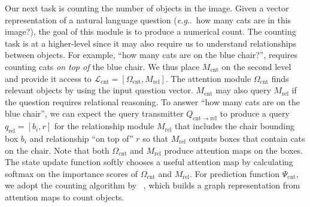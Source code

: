 \documentclass{article}
\makeatletter
\def\Mrel{M_\mathrm{rel}}
\def\Mcnt{M_\mathrm{cnt}}
\DeclareRobustCommand\onedot{\futurelet\@let@token\@onedot}
\def\@onedot{\ifx\@let@token.\else.\null\fi\xspace}
\def\eg{\emph{e.g}\onedot} \def\Eg{\emph{E.g}\onedot}
\makeatother
\begin{document}
Our next task is counting the number of objects in the image.
Given a vector representation of a natural language question (\eg~how many cats are in this image?), the goal of this module is to produce a numerical count.
The counting task is at a higher-level since it may also require us to understand relationships between objects.
For example, ``how many cats are on the blue chair?'', requires counting cats \emph{on top of} the blue chair.
We thus place $\Mcnt$ on the second level and provide it access to $\mathcal L_\mathrm{cnt} = [\Omega_\mathrm{cnt}, \Mrel]$.
The attention module $\Omega_\mathrm{cnt}$ finds relevant objects by using the input question vector.
$\Mcnt$ may also query $\Mrel$ if the question requires relational reasoning.
To answer ``how many cats are on the blue chair'', we can expect the query transmitter $Q_{\mathrm{cnt}\rightarrow \mathrm{rel}}$ to produce a query $q_\mathrm{rel} = [b_i, r]$ for the relationship module $\Mrel$ that includes the chair bounding box $b_i$ and relationship ``on top of'' $r$ so that $\Mrel$ outputs boxes that contain cats on the chair.
Note that both $\Omega_\mathrm{cnt}$ and $\Mrel$ produce attention maps on the boxes.
The state update function softly chooses a useful attention map by calculating softmax on the importance scores of $\Omega_\mathrm{cnt}$ and $\Mrel$.
For prediction function $\Psi_\mathrm{cnt}$, we adopt the counting algorithm by ~\cite{zhang18}, which builds a graph representation from attention maps to count objects.
\end{document}
